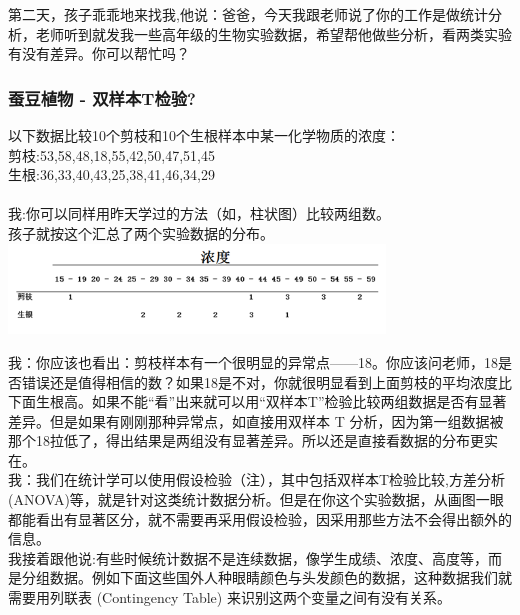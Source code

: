 第二天，孩子乖乖地来找我,他说：爸爸，今天我跟老师说了你的工作是做统计分析，老师听到就发我一些高年级的生物实验数据，希望帮他做些分析，看两类实验有没有差异。你可以帮忙吗？\\

\hypertarget{ux8695ux8c46ux690dux7269---ux53ccux6837ux672ctux68c0ux9a8c}{%
\subsubsection{蚕豆植物 -
双样本T检验?}\label{ux8695ux8c46ux690dux7269---ux53ccux6837ux672ctux68c0ux9a8c}}

以下数据比较10个剪枝和10个生根样本中某一化学物质的浓度：\\
剪枝:53,58,48,18,55,42,50,47,51,45\\
生根:36,33,40,43,25,38,41,46,34,29\\
~\\
我:你可以同样用昨天学过的方法（如，柱状图）比较两组数。\\
孩子就按这个汇总了两个实验数据的分布。\\


\includegraphics[width=10cm]{图片61-11.png}

我：你应该也看出：剪枝样本有一个很明显的异常点——18。你应该问老师，18是否错误还是值得相信的数？如果18是不对，你就很明显看到上面剪枝的平均浓度比下面生根高。如果不能“看”出来就可以用“双样本T”检验比较两组数据是否有显著差异。但是如果有刚刚那种异常点，如直接用双样本 T 分析，因为第一组数据被那个18拉低了，得出结果是两组没有显著差异。所以还是直接看数据的分布更实在。\\

我：我们在统计学可以使用假设检验（注），其中包括双样本T检验比较,方差分析(ANOVA)等，就是针对这类统计数据分析。但是在你这个实验数据，从画图一眼都能看出有显著区分，就不需要再采用假设检验，因采用那些方法不会得出额外的信息。\\

我接着跟他说:有些时候统计数据不是连续数据，像学生成绩、浓度、高度等，而是分组数据。例如下面这些国外人种眼睛颜色与头发颜色的数据，这种数据我们就需要用列联表 (Contingency Table) 来识别这两个变量之间有没有关系。\\

